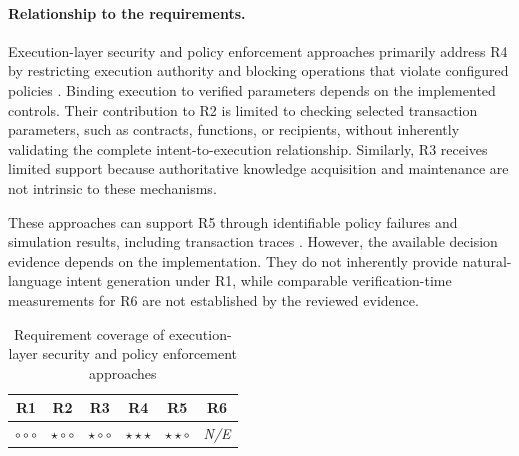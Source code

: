\paragraph{Relationship to the requirements.}


Execution-layer security and policy enforcement approaches
primarily address R4 by restricting execution authority and
blocking operations that violate configured policies
\cite{buterinERC4337AccountAbstraction2021,
zeroDevPermissionsSessionKeys2026,
safeSmartAccountGuards2026}. Binding execution to verified
parameters depends on the implemented controls. Their contribution to R2 is limited to checking selected
transaction parameters, such as contracts, functions, or
recipients, without inherently validating the complete
intent-to-execution relationship. Similarly, R3 receives
limited support because authoritative knowledge acquisition
and maintenance are not intrinsic to these mechanisms.

These approaches can support R5 through identifiable policy
failures and simulation results, including transaction traces
\cite{safeSmartAccountGuards2026,
tenderlyTransactionSimulation2026}. However, the available
decision evidence depends on the implementation. They do
not inherently provide natural-language intent generation
under R1, while comparable verification-time measurements
for R6 are not established by the reviewed evidence.

\begin{table}[H]
\centering
\renewcommand{\arraystretch}{1.3}
\begin{tabular}{cccccc}
\hline
\textbf{R1} & \textbf{R2} & \textbf{R3} &
\textbf{R4} & \textbf{R5} & \textbf{R6} \\
\hline

$\circ\circ\circ$ &
$\star\circ\circ$ &
$\star\circ\circ$ &
$\star\star\star$ &
$\star\star\circ$ &
\textit{N/E} \\

\hline
\end{tabular}
\caption{Requirement coverage of execution-layer security
and policy enforcement approaches}
\label{tab:req_execution_layer}
\end{table}




